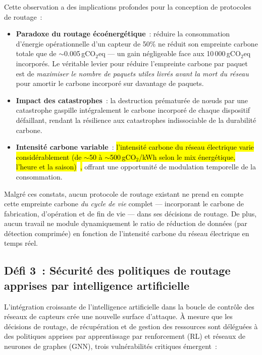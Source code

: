Cette observation a des implications profondes pour la conception de protocoles de routage~:

\begin{itemize}
    \item \textbf{Paradoxe du routage écoénergétique}~: réduire la consommation d'énergie opérationnelle d'un capteur de 50\% ne réduit son empreinte carbone totale que de $\sim$0.005\,gCO$_2$eq --- un gain négligeable face aux 10\,000\,gCO$_2$eq incorporés. Le véritable levier pour réduire l'empreinte carbone par paquet est de \emph{maximiser le nombre de paquets utiles livrés avant la mort du réseau} pour amortir le carbone incorporé sur davantage de paquets.
    \item \textbf{Impact des catastrophes}~: la destruction prématurée de n\oe{}uds par une catastrophe gaspille intégralement le carbone incorporé de chaque dispositif défaillant, rendant la résilience aux catastrophes indissociable de la durabilité carbone.
    \item \textbf{Intensité carbone variable}~: \hl{l'intensité carbone du réseau électrique varie considérablement (de $\sim$50 à $\sim$500\,gCO$_2$/kWh selon le mix énergétique, l'heure et la saison)}~\cite{ember2024,uk_carbon_api,carbon_signals_acm2025}\hl{,} offrant une opportunité de modulation temporelle de la consommation.
\end{itemize}

Malgré ces constats, aucun protocole de routage existant ne prend en compte cette empreinte carbone \emph{du cycle de vie} complet --- incorporant le carbone de fabrication, d'opération et de fin de vie --- dans ses décisions de routage. De plus, aucun travail ne module dynamiquement le ratio de réduction de données (par détection comprimée) en fonction de l'intensité carbone du réseau électrique en temps réel.


\subsection{Défi 3~: Sécurité des politiques de routage apprises par intelligence artificielle}

L'intégration croissante de l'intelligence artificielle dans la boucle de contrôle des réseaux de capteurs crée une nouvelle surface d'attaque. À mesure que les décisions de routage, de récupération et de gestion des ressources sont déléguées à des politiques apprises par apprentissage par renforcement (RL) et réseaux de neurones de graphes (GNN), trois vulnérabilités critiques émergent~:


